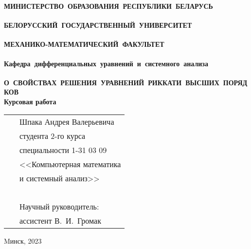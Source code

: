 \setcounter{page}{1}
\thispagestyle{empty}
\begin{center}
\bf
\vspace{4cm}
{
\mbox{МИНИСТЕРСТВО~ОБРАЗОВАНИЯ~РЕСПУБЛИКИ~БЕЛАРУСЬ} \\~\\
\mbox{БЕЛОРУССКИЙ~ГОСУДАРСТВЕННЫЙ~УНИВЕРСИТЕТ} \\~\\
\mbox{МЕХАНИКО-МАТЕМАТИЧЕСКИЙ~ФАКУЛЬТЕТ} \\~\\
\mbox{Кафедра~дифференциальных~уравнений~и~системного~анализа} \\~\\
}
\vspace{4cm}
\bf
\mbox{О СВОЙСТВАХ РЕШЕНИЯ УРАВНЕНИЙ РИККАТИ ВЫСШИХ ПОРЯДКОВ}\\
\vspace{1cm}
\rm Курсовая работа 
\vspace{3cm}
\end{center}
\begin{tabular}{ll}
\hspace{10.5cm}
&Шпака Андрея Валерьевича~\\
&студента 2-го курса\\
&специальности 1-31 03 09\\
&<<Компьютерная математика\\
&и системный анализ>>\\~\\
&Научный руководитель:\\
&ассистент В.~И.~Громак
\end{tabular}
\vspace{4cm}
\begin{center}
Mинск, 2023
\end{center}
\clearpage
\restoregeometry